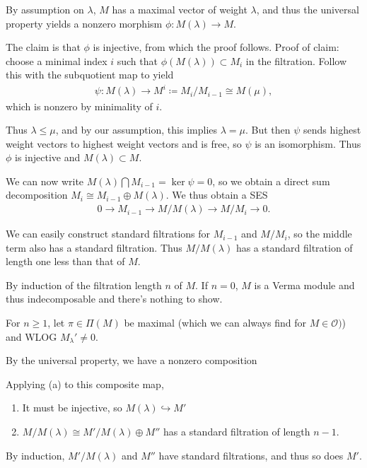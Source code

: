 \documentclass[11pt]{scrartcl}
\theoremstyle{definition}
\theoremstyle{theorem}
\theoremstyle{proof}
\newenvironment{proof}
{\pushQED{$\qed$}\pf}
{\par\popQED\endpf}
\theoremstyle{definition}
\theoremstyle{break}
\theoremstyle{problem}
\providecommand{\tightlist}{%
  \setlength{\itemsep}{0pt}\setlength{\parskip}{0pt}}
\newcommand{\definedas}[0]{\coloneqq}
\newcommand{\injects}[0]{\hookrightarrow}
\newcommand{\intersect}[0]{\bigcap}
\newcommand{\OO}[0]{{\mathcal{O}}}
\renewcommand{\qed}[0]{\hfill\blacksquare}
\renewcommand{\to}[0]{\longrightarrow}
\begin{document}
\begin{proof}[of (a)]

By assumption on \(\lambda\), \(M\) has a maximal vector of weight
\(\lambda\), and thus the universal property yields a nonzero morphism
\(\phi: M(\lambda) \to M\).

The claim is that \(\phi\) is injective, from which the proof follows.
Proof of claim: choose a minimal index \(i\) such that
\(\phi(M(\lambda)) \subset M_i\) in the filtration. Follow this with the
subquotient map to yield
\begin{align*}\psi: M(\lambda) \to M^i \definedas M_i/M_{i-1} \cong M(\mu),\end{align*}
which is nonzero by minimality of \(i\).

Thus \(\lambda \leq \mu\), and by our assumption, this implies
\(\lambda = \mu\). But then \(\psi\) sends highest weight vectors to
highest weight vectors and is free, so \(\psi\) is an isomorphism. Thus
\(\phi\) is injective and \(M(\lambda) \subset M\).

We can now write \(M(\lambda) \intersect M_{i-1} = \ker \psi = 0\), so
we obtain a direct sum decomposition
\(M_i \cong M_{i-1} \oplus M(\lambda)\). We thus obtain a SES
\begin{align*}0 \to M_{i-1} \to M/M(\lambda) \to M/M_i \to 0.\end{align*}

We can easily construct standard filtrations for \(M_{i-1}\) and
\(M/M_i\), so the middle term also has a standard filtration. Thus
\(M/M(\lambda)\) has a standard filtration of length one less than that
of \(M\).\end{proof}

\begin{proof}[of(b)]

By induction of the filtration length \(n\) of \(M\). If \(n=0\), \(M\)
is a Verma module and thus indecomposable and there's nothing to show.

For \(n\geq 1\), let \(\pi \in \Pi(M)\) be maximal (which we can always
find for \(M\in \OO)\)) and WLOG \(M_\lambda' \neq 0\).

By the universal property, we have a nonzero composition

\begin{center}
\end{center}

Applying (a) to this composite map,

\begin{enumerate}
\def\labelenumi{\arabic{enumi}.}
\tightlist
\item
  It must be injective, so \(M(\lambda) \injects M'\)
\item
  \(M/M(\lambda) \cong M'/M(\lambda) \oplus M''\) has a standard
  filtration of length \(n-1\).
\end{enumerate}

By induction, \(M'/M(\lambda)\) and \(M''\) have standard filtrations,
and thus so does \(M'\).\end{proof}
\end{document}
